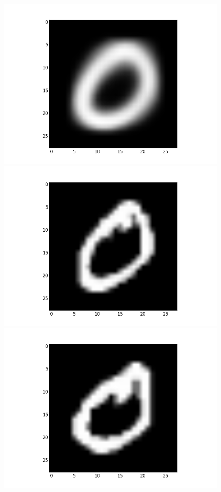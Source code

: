 \documentclass[submit]{harvardml}
\begin{document}
\begin{figure}[ht]
    \centering
    \includegraphics[scale=0.20]{K10-mean-5}
    \includegraphics[scale=0.20]{K10-representative-5-0}
    \includegraphics[scale=0.20]{K10-representative-5-1}

\end{figure}
\end{document}
